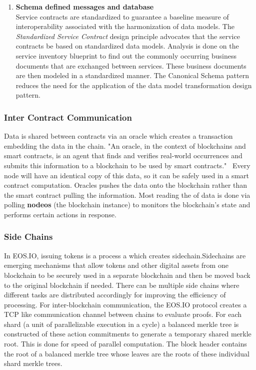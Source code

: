 \documentclass[]{article}
\begin{document}
\begin{enumerate}
	\item \textbf{Schema defined messages and database} \\
	Service contracts are standardized to guarantee a baseline measure of interoperability associated with the harmonization of data models.
	The \textit{Standardized Service Contract} design principle advocates that the service contracts be based on standardized data models. Analysis is done on the service inventory blueprint to find out the commonly occurring business documents that are exchanged between services. These business documents are then modeled in a standardized manner. The Canonical Schema pattern reduces the need for the application of the data model transformation design pattern.
	\cite{1}
	
	


	
		
\end{enumerate}
	 
	\subsubsection{Inter Contract Communication}
	Data is shared between contracts via an oracle which creates a transaction embedding the data in the chain. 
	"An oracle, in the context of blockchains and smart contracts, is an agent that finds and verifies real-world occurrences and submits this information to a blockchain to be used by smart contracts."\ 
	\cite{2}
	Every node will have an identical copy of this data, so it can be safely used in a smart contract computation.
	Oracles pushes the data onto the blockchain rather than the smart contract pulling the information.
	Most reading the of data is done via polling \textbf{nodeos} (the blockchain instance)
	to monitors the blockchain's state and performs certain actions in response. 
	
	
	\subsubsection{Side Chains}
	In EOS.IO, issuing tokens is a process a which creates sidechain.Sidechains are emerging mechanisms that allow tokens and other digital assets from one blockchain to be securely used in a separate blockchain and then be moved back to the original blockchain if needed. 
	There can be multiple side chains where different tasks are distributed accordingly for improving the efficiency of processing. 	
	For inter-blockchain communication, the EOS.IO protocol creates a TCP like communication channel between chains to evaluate proofs.
	For each shard (a unit of parallelizable execution in a cycle) a balanced merkle tree is constructed of these action commitments to generate a temporary shared merkle root. 
	This is done for speed of parallel computation. The block header contains the root of a balanced merkle tree whose leaves are the roots of these individual shard merkle trees.
	\cite{3} 
\end{document}
